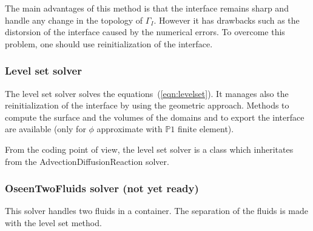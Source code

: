 \documentclass[11pt]{article}
\begin{document}
The main advantages of this method is that the interface remains sharp and handle any change in the topology of $\Gamma_I$. However it has drawbacks such as the distorsion of the interface caused by the numerical errors. To overcome this problem, one should use reinitialization of the interface.

\subsubsection{Level set solver}
The level set solver solves the equations~(\ref{eqn:levelset}). It manages also the reinitialization of the interface by using the geometric approach. Methods to compute the surface and the volumes of the domains  and to export the interface are available (only for $\phi$ approximate with $\mathbb{P}1$ finite element).

From the coding point of view, the level set solver is a class which inheritates from the AdvectionDiffusionReaction solver.

\subsubsection{OseenTwoFluids solver (not yet ready)}
This solver handles two fluids in a container. The separation of the fluids is made with the level set method.
\end{document}
